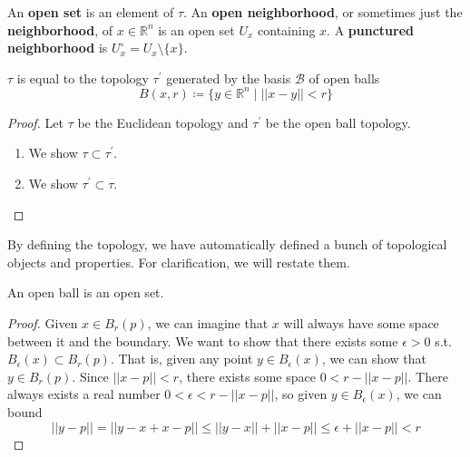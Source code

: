 \documentclass{article}
\begin{document}
    \begin{definition}
      An \textbf{open set} is an element of $\tau$. An \textbf{open neighborhood}, or sometimes just the \textbf{neighborhood}, of $x \in \mathbb{R}^n$ is an open set $U_x$ containing $x$. A \textbf{punctured neighborhood} is $U_x^{\circ} = U_x \setminus \{x\}$. 
    \end{definition}

    \begin{theorem}
      $\tau$ is equal to the topology $\tau^\prime$ generated by the basis $\mathscr{B}$ of open balls 
      \begin{equation} 
        B(x, r) \coloneqq \{ y \in \mathbb{R}^n \mid ||x - y|| < r\}
      \end{equation}
    \end{theorem} 
    \begin{proof}
      Let $\tau$ be the Euclidean topology and $\tau^\prime$ be the open ball topology. 
      \begin{enumerate}
        \item We show $\tau \subset \tau^\prime$. 
        \item We show $\tau^\prime \subset \tau$. 
      \end{enumerate}
    \end{proof} 

    By defining the topology, we have automatically defined a bunch of topological objects and properties. For clarification, we will restate them. 
    
    \begin{corollary}
      An open ball is an open set. 
    \end{corollary}
    \begin{proof}
      Given $x \in B_r (p)$, we can imagine that $x$ will always have some space between it and the boundary. We want to show that there exists some $\epsilon >0$ s.t. $B_\epsilon (x) \subset B_r (p)$. That is, given any point $y \in B_\epsilon (x)$, we can show that $y \in B_r (p)$. Since $||x - p|| < r$, there exists some space $0 < r - ||x - p||$. There always exists a real number $0 < \epsilon < r - ||x - p||$, so given $y \in B_\epsilon (x)$, we can bound
      \begin{equation}
        ||y - p|| = ||y - x + x - p|| \leq ||y - x|| + ||x - p|| \leq \epsilon + ||x - p|| < r
      \end{equation}
    \end{proof}
\end{document}
